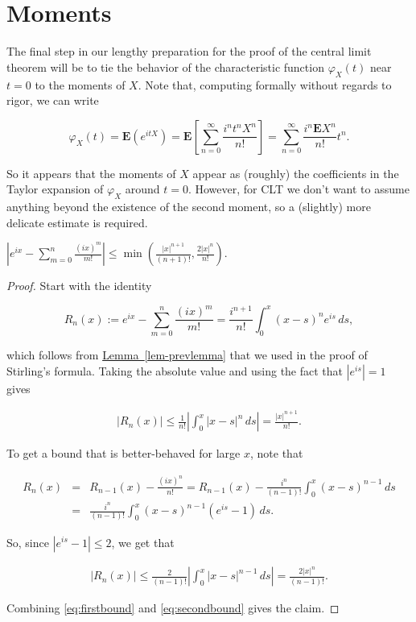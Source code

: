 \section{Moments}

The final step in our lengthy preparation for the
proof of the central limit theorem will be to tie the
behavior of the characteristic function $\varphi_X(t)$
near $t=0$ to the moments of $X$. Note that,
computing formally without regards to rigor, we can
write

\[
\varphi_X(t) = \mathbf{E} (e^{itX}) = \mathbf{E}\left[\sum_{n=0}^\infty \frac{i^n t^n X^n}{n!} \right]
= \sum_{n=0}^\infty \frac{i^n \mathbf{E} X^n}{n!} t^n.
\]

\noindent So it appears that the moments of $X$ appear as
(roughly) the coefficients in the Taylor expansion of
$\varphi_X$ around $t=0$. However, for CLT we don't
want to assume anything beyond the existence of the
second moment, so a (slightly) more delicate estimate
is required.

\begin{lem}
\label{lem-taylor-estimate}
$\left|e^{ix}-\sum_{m=0}^n \frac{(ix)^m}{m!}\right|
\le
\min\left(\frac{|x|^{n+1}}{(n+1)!},\frac{2|x|^n}{n!}\right).$
\end{lem}

\begin{proof}
Start with the identity

\[
R_n(x) := e^{ix}-\sum_{m=0}^n \frac{(ix)^m}{m!} = \frac{i^{n+1}}{n!}\int_0^x(x-s)^n e^{is}\,ds,
\]

\noindent which follows from \hyperref[lem-prevlemma]{Lemma~\ref*{lem-prevlemma}} that we used
in the proof of Stirling's formula. Taking the
absolute value and using the fact that $|e^{is}|=1$
gives

\begin{align*}
\tag{14}\label{eq:firstbound}
|R_n(x)| \le \frac{1}{n!} \left|\int_0^x |x-s|^n\,ds\right| = \frac{|x|^{n+1}}{n!}.
\end{align*}

\noindent To get a bound that is better-behaved for large $x$,
note that

\begin{eqnarray*} R_n(x) &=& R_{n-1}(x) - \frac{(ix)^n}{n!} = R_{n-1}(x) - \frac{i^n}{(n-1)!}\int_0^x (x-s)^{n-1}\,ds \\
&=& \frac{i^n}{(n-1)!}\int_0^x (x-s)^{n-1}(e^{is}-1)\,ds.
\end{eqnarray*}

\noindent So, since $|e^{is}-1|\le 2$, we get that

\begin{align*}
\tag{15}\label{eq:secondbound}
|R_n(x)| \le \frac{2}{(n-1)!} \left|\int_0^x |x-s|^{n-1}\,ds\right| = \frac{2|x|^{n}}{(n-1)!}.
\end{align*}

\noindent Combining \eqref{eq:firstbound} and \eqref{eq:secondbound}
gives the claim.
\end{proof}

